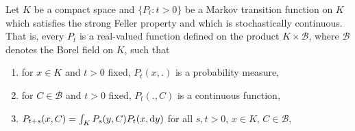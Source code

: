 \begin{example}\label{ex:b4-2.6}
Let $K$ be a compact space and $\{P_t \colon t > 0\}$ be a
Markov transition function on $K$ which satisfies the strong Feller
property and which is stochastically continuous.
That is, every
$P_t$ is a real-valued function defined on the product $K \times \mathcal{B}$, where $\mathcal{B}$
denotes the Borel field on $K$, such that
\begin{enumerate}[\upshape (i)]
    \item 
    for $x \in K$ and $t > 0$ fixed, $P_t(x,.)$ is a probability measure,

    \item 
    for $C \in \mathcal{B}$ and $t > 0$ fixed, $P_t(.,C)$ is a continuous function,

    \item 
    $P_{t+s}(x,C) = \int_K P_s(y,C)P_t(x,\mathop{}\!\mathrm{d}{y})$ for all $s,t > 0$, $x \in K$, $C \in \mathcal{B}$,


\end{enumerate}
\end{example}
